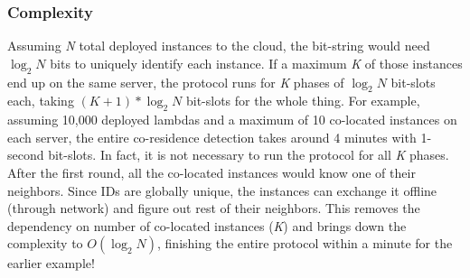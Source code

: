 \subsubsection{Complexity}
\label{sec:protocol:complexity}
Assuming \textit{N} total deployed instances to the cloud, the bit-string would
need $\log_2N$ bits to uniquely identify each instance. If a maximum \textit{K}
of those instances end up on the same server, the protocol runs for \textit{K}
phases of $\log_2N$ bit-slots each, taking $(K+1)*\log_2N$ bit-slots for the
whole thing. For example, assuming 10,000 deployed lambdas and a maximum of 10
co-located instances on each server, the entire  co-residence detection takes
around 4 minutes with 1-second bit-slots.  In fact, it is not necessary to run
the protocol for all \textit{K} phases. After the first round, all the
co-located instances would know one of their neighbors. Since IDs are globally
unique, the instances can exchange it offline (through network) and figure out
rest of their neighbors. This removes the dependency on number of co-located
instances (\textit{K}) and brings down the complexity to $O(\log_2N)$, finishing
the entire protocol within a minute for the earlier example!


